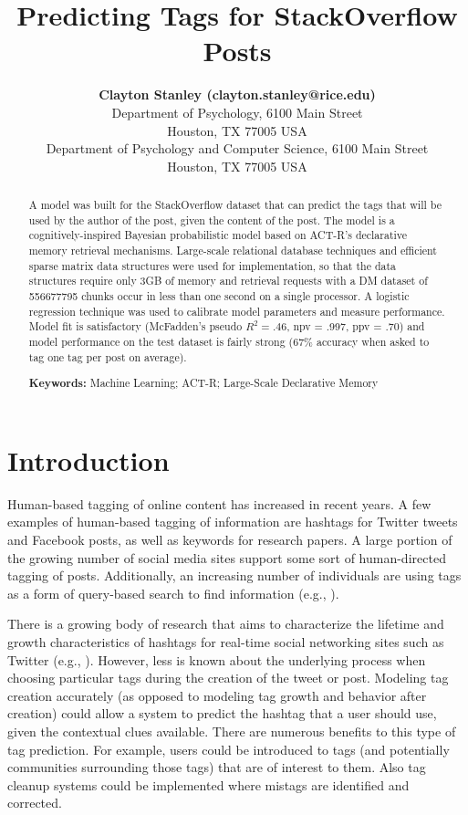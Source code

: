 \documentclass[10pt,letterpaper]{article}
\title{Predicting Tags for StackOverflow Posts}
\author{{\large \bf Clayton Stanley (clayton.stanley@rice.edu)} \\
  Department of Psychology, 6100 Main Street \\
  Houston, TX 77005 USA 
  \AND {\large \bf Michael D. Byrne (byrne@rice.edu)} \\
  Department of Psychology and Computer Science, 6100 Main Street \\
  Houston, TX 77005 USA }
\begin{document}
\maketitle

\frenchspacing

\begin{abstract}
  A model was built for the StackOverflow dataset that can predict the tags that will be used by the author of the post, given the content of the post.
  The model is a cognitively-inspired Bayesian probabilistic model based on ACT-R's declarative memory retrieval mechanisms.
  Large-scale relational database techniques and efficient sparse matrix data structures were used for implementation,
  so that the data structures require only 3GB of memory and retrieval requests with a DM dataset of \num{556677795} chunks occur in less than one second on a single processor.
  A logistic regression technique was used to calibrate model parameters and measure performance.
  Model fit is satisfactory (McFadden's pseudo $R_{}^{2}=.46$, npv = .997, ppv = .70) and model performance on the test dataset is fairly strong (67\% accuracy when asked to tag one tag per post on average).

  \textbf{Keywords:} 
  Machine Learning; ACT-R; Large-Scale Declarative Memory
\end{abstract}

\section{Introduction}

Human-based tagging of online content has increased in recent years.
A few examples of human-based tagging of information are hashtags for Twitter tweets and Facebook posts, as well as keywords for research papers.
A large portion of the growing number of social media sites support some sort of human-directed tagging of posts.
Additionally, an increasing number of individuals are using tags as a form of query-based search to find information
(e.g., ).

There is a growing body of research that aims to characterize the lifetime and growth characteristics of hashtags for real-time social networking sites such as Twitter
(e.g., ).
However, less is known about the underlying process when choosing particular tags during the creation of the tweet or post.
Modeling tag creation accurately (as opposed to modeling tag growth and behavior after creation) could allow a system to predict the hashtag that a user should use, given the contextual clues available.
There are numerous benefits to this type of tag prediction.
For example, users could be introduced to tags (and potentially communities surrounding those tags) that are of interest to them.
Also tag cleanup systems could be implemented where mistags are identified and corrected.
\end{document}
